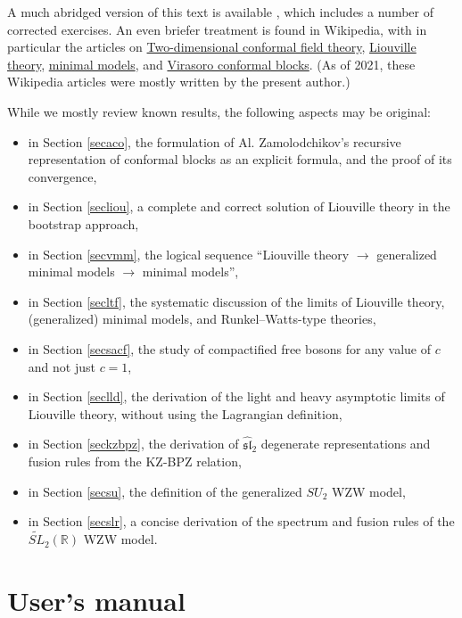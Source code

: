 \documentclass[12pt, a4paper, notitlepage, twoside]{report}
\numberwithin{equation}{section}
\theoremstyle{break}
\begin{document}
A much abridged version of this text is available \cite{rib16}, which includes a number of corrected exercises. An even briefer treatment is found in Wikipedia, with in particular the articles on \href{https://en.wikipedia.org/wiki/Two-dimensional_conformal_field_theory}{Two-dimensional conformal field theory}, \href{https://en.wikipedia.org/wiki/Liouville_field_theory}{Liouville theory},
\href{https://en.wikipedia.org/wiki/Minimal_models}{minimal models}, and \href{https://en.wikipedia.org/wiki/Virasoro_conformal_block}{Virasoro conformal blocks}.
(As of 2021, these Wikipedia articles were mostly written by the present author.)

While we mostly review known results, the following aspects may be original:
\begin{itemize}
\item in Section \ref{secaco}, the formulation of Al. Zamolodchikov's recursive representation of conformal blocks as an explicit formula, and the proof of its convergence,
\item in Section \ref{secliou}, a complete and correct solution of Liouville theory in the bootstrap approach, 
\item in Section \ref{secvmm}, the logical sequence ``Liouville theory $\rightarrow$ generalized minimal models $\rightarrow$ minimal models'',
\item in Section \ref{secltf}, the systematic discussion of the limits of Liouville theory, (generalized) minimal models, and Runkel--Watts-type theories,
\item in Section \ref{secsacf}, the study of compactified free bosons for any value of $c$ and not just $c=1$,
\item in Section \ref{seclld}, the derivation of the light and heavy asymptotic limits of Liouville theory, without using the Lagrangian definition,
\item in Section \ref{seckzbpz}, the derivation of $\widehat{\mathfrak{sl}}_2$ degenerate representations and fusion rules from the KZ-BPZ relation,
\item in Section \ref{secsu}, the definition of the generalized $SU_2$ WZW model,
\item in Section \ref{secslr}, a concise derivation of the spectrum and fusion rules of the $\widetilde{SL}_2(\mathbb{R})$ WZW model.
\end{itemize}


\section{User's manual}
\end{document}

